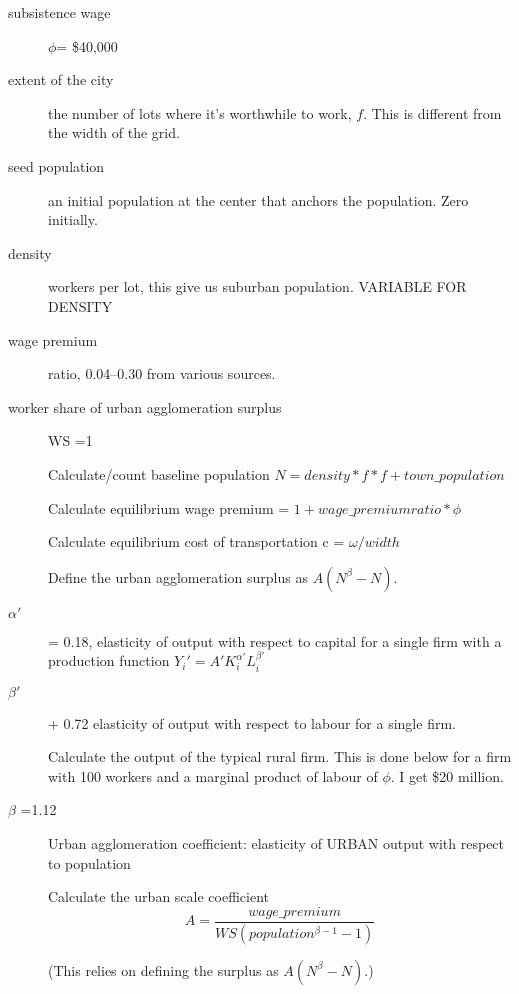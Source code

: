 \begin{description}
\item  [subsistence wage] $\phi$=  \$40,000 %
\item  [extent of the city] the number of lots where it's worthwhile to work, $f$. This is different from the width of the grid.  %
\item [seed population] %
an initial %
population at the center that anchors the population. %
Zero initially. %
\item  [density ] workers per lot, this give us suburban population. VARIABLE FOR DENSITY %
\item  [wage premium] ratio, 0.04--0.30 from various sources.
\item [worker share of urban agglomeration surplus] 
WS =1 

Calculate/count baseline population 
$N=density * f * f  + town\_population$

Calculate  equilibrium wage premium = $1+wage\_premium ratio * \phi$

Calculate equilibrium cost of transportation c = $\omega/width$

Define the urban agglomeration surplus as $A(N^\beta-N)$.
 
\item  [$\alpha'$ ] =  0.18, elasticity of output with respect to capital for a single firm with a production function $Y_i'=A' K_i^{\alpha '}L^{\beta '}_i$
\item  [$\beta'$ ]  + 0.72 elasticity of output with respect to labour for a single firm.

Calculate the output of the typical rural firm. This is done below for a firm with 100 workers and a marginal product of labour of $\phi$. I get \$20 million.

\item  [$\beta$ =1.12] Urban agglomeration coefficient: elasticity of URBAN output with respect to population 

Calculate the urban scale coefficient 
\[A = \frac{wage\_premium}{WS(population^{\beta-1}-1)}\]

(This relies on defining the surplus as $A(N^\beta-N)$.)

\end{description}


